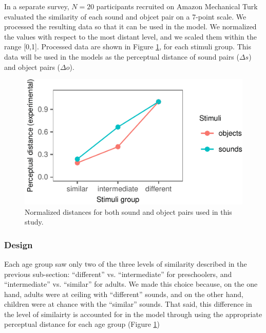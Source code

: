 \documentclass[10pt, letterpaper]{article}
\newenvironment{CodeChunk}{}{}
\begin{document}
In a separate survey, \(N=20\) participants recruited on Amazon
Mechanical Turk evaluated the similarity of each sound and objcet pair
on a 7-point scale. We processed the resulting data so that it can be
used in the model. We normalized the values with respect to the most
distant level, and we scaled them within the range {[}0,1{]}. Processed
data are shown in Figure \ref{fig:stim}, for each stimuli group. This
data will be used in the models as the perceptual distance of sound
pairs (\(\Delta s\)) and object pairs (\(\Delta o\)).

\begin{CodeChunk}
\begin{figure}[h]

{\centering \includegraphics{figs/stim-1} 

}

\caption{\label{fig:stim}Normalized distances for both sound and object pairs used in this study.}\label{fig:stim}
\end{figure}
\end{CodeChunk}

\subsubsection{Design}\label{design}

Each age group saw only two of the three levels of similarity described
in the previous sub-section: ``different'' vs. ``intermediate'' for
preschoolers, and ``intermediate'' vs. ``similar'' for adults. We made
this choice because, on the one hand, adults were at ceiling with
``different'' sounds, and on the other hand, children were at chance
with the ``similar'' sounds. That said, this difference in the level of
similairty is accounted for in the model through using the appropriate
perceptual distance for each age group (Figure \ref{fig:stim})
\end{document}
